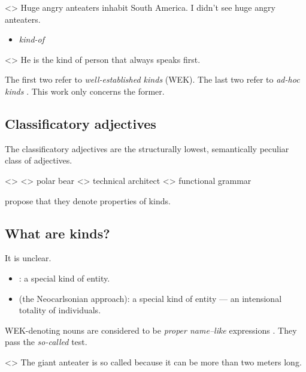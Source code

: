 \documentclass[a4paper,12pt]{article}
\begin{document}
\pex<>
    \a Huge angry anteaters inhabit South America.
    \a I didn't see huge angry anteaters.
\xe
    
\begin{itemize}
    \item \textit{kind-of} \parencite{carlson1977referencekindsenglish}
\end{itemize}
    
\ex<>
    He is the kind of person that always speaks first.
\xe

The first two refer to \emph{well-established kinds} (WEK). The last two refer to \emph{\textit{ad-hoc} kinds} \parencite{mendia2019referenceadhoc}. This work only concerns the former.

\subsection{Classificatory adjectives}

The classificatory adjectives are the structurally lowest, semantically peculiar class of adjectives.
    
    \pex<>
        \a<> polar bear
        \a<> technical architect
        \a<> functional grammar
    \xe

\textcite{mcnally2004relationaladjectivesproperties} propose that they denote properties of kinds.

\subsection{What are kinds?}

It is unclear.

\begin{itemize}
    \item \textcite{carlson1977referencekindsenglish}: a special kind of entity.
    \item \textcite{chierchia1998referencekindslanguages} (the Neocarlsonian approach): a special kind of entity --- an intensional totality of individuals.
\end{itemize}

WEK-denoting nouns are considered to be \emph{proper name--like} expressions \parencite{carlson1977referencekindsenglish,krifka1995genericityintroduction}. They pass the \textit{so-called} test.

\ex<>
    The giant anteater is so called because it can be more than two meters long.
\xe
\end{document}
